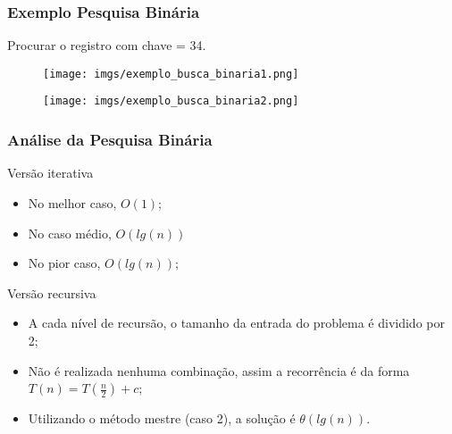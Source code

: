 \documentclass[aspectratio=169]{beamer}
\begin{document}

\begin{frame}
\frametitle{Exemplo Pesquisa Binária}
Procurar o registro com chave = 34.
\begin{figure}[!h]
  \centering
  \texttt{[image: imgs/exemplo\_busca\_binaria1.png]}
  \label{fig_exemplo_busca_binaria1}
\end{figure}
\pause
\begin{figure}[!h]
  \centering
  \texttt{[image: imgs/exemplo\_busca\_binaria2.png]}
  \label{fig_exemplo_busca_binaria2}
\end{figure}

\end{frame}


\begin{frame}
\frametitle{Análise da Pesquisa Binária}
\begin{block} {Versão iterativa}
\begin{itemize}
 \item No melhor caso, $O(1)$;
 \item No caso médio, $O(lg(n))$
 \item No pior caso, $O(lg(n))$;
\end{itemize}
\end{block}
 
\begin{block}{Versão recursiva}
\begin{itemize}
 \item A cada nível de recursão, o tamanho da entrada do problema é dividido por 2;
 \item Não é realizada nenhuma combinação, assim a recorrência é da forma $T(n) = T(\frac{n}{2}) + c$;
 \item Utilizando o método mestre (caso 2), a solução é $\theta(lg(n))$.
\end{itemize}
\end{block}
\end{frame}

\end{document}
